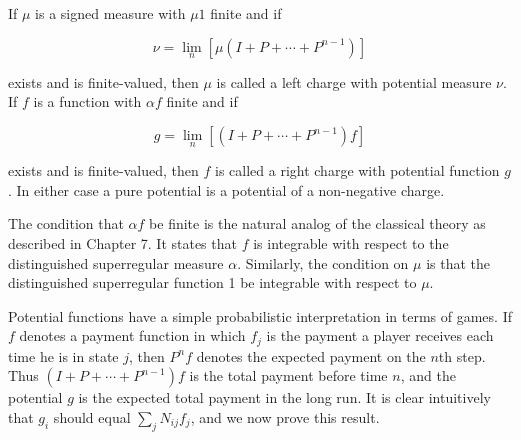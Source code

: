 If $\mu$ is a signed measure with $\mu 1$ finite and if

$$\nu = \lim_n [\mu(I + P + \cdots + P^{n-1})]$$

exists and is finite-valued, then $\mu$ is called a left charge with potential measure $\nu$. If $f$ is a function with $\alpha f$ finite and if

$$g = \lim_n [(I + P + \cdots + P^{n-1})f]$$

exists and is finite-valued, then $f$ is called a right charge with potential function $g$. In either case a pure potential is a potential of a non-negative charge.

The condition that $\alpha f$ be finite is the natural analog of the classical theory as described in Chapter 7. It states that $f$ is integrable with respect to the distinguished superregular measure $\alpha$. Similarly, the condition on $\mu$ is that the distinguished superregular function 1 be integrable with respect to $\mu$.

Potential functions have a simple probabilistic interpretation in terms of games. If $f$ denotes a payment function in which $f_j$ is the payment a player receives each time he is in state $j$, then $P^n f$ denotes the expected payment on the $n$th step. Thus $(I + P + \cdots + P^{n-1})f$ is the total payment before time $n$, and the potential $g$ is the expected total payment in the long run. It is clear intuitively that $g_i$ should equal $\sum_j N_{ij} f_j$, and we now prove this result.
